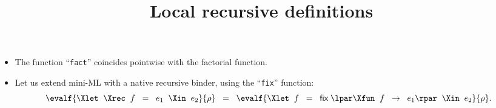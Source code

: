 \documentclass[wide]{slides}
\begin{document}
\begin{slide}
  \title{Local recursive definitions}

  \begin{itemize}

    \item The function ``\texttt{fact}'' coincides pointwise with the
      factorial function.


    \item Let us extend mini-ML with a native recursive binder, using
      the ``\texttt{fix}'' function:
      \smallskip
      \begin{equation*}
        \evalf{\Xlet \;\; \Xrec \;\; f \;\; = \;\; e_1 \;\; \Xin \;\;
          e_2}{\rho} \;\; = \;\; \evalf{\Xlet \;\; f \;\; = \;\;
          \textsf{fix} \; \lpar\Xfun \;\; f \;\; \rightarrow \;\; e_1\rpar \;\;
          \Xin \;\; e_2}{\rho}.
      \end{equation*}

  \end{itemize}

\end{slide}
\end{document}
